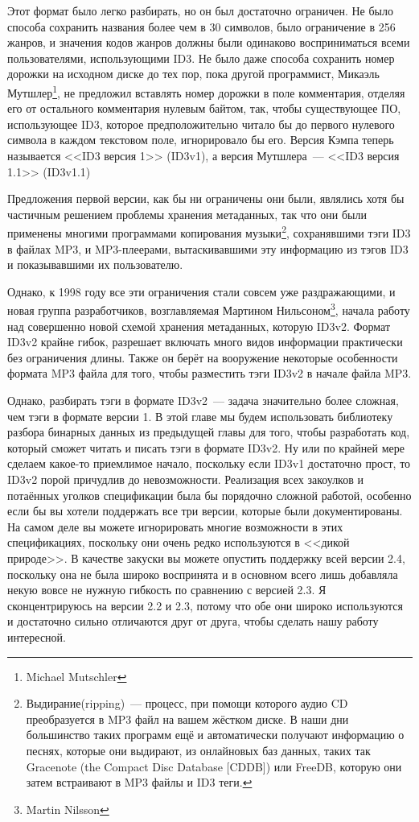 Этот формат было легко разбирать, но он был достаточно ограничен. Не было способа
сохранить названия более чем в 30 символов, было ограничение в 256 жанров, и значения
кодов жанров должны были одинаково восприниматься всеми пользователями, использующими
ID3. Не было даже способа сохранить номер дорожки на исходном диске до тех пор, пока
другой программист, Микаэль Мутшлер\footnote{Michael Mutschler}, не предложил вставлять
номер дорожки в поле комментария, отделяя его от остального комментария нулевым байтом,
так, чтобы существующее ПО, использующее ID3, которое предположительно читало бы до
первого нулевого символа в каждом текстовом поле, игнорировало бы его. Версия Кэмпа теперь
называется <<ID3 версия 1>> (ID3v1), а версия Мутшлера~--- <<ID3 версия 1.1>> (ID3v1.1)

Предложения первой версии, как бы ни ограничены они были, являлись хотя бы частичным
решением проблемы хранения метаданных, так что они были применены многими программами
копирования музыки\footnote{Выдирание(ripping)~--- процесс, при помощи которого аудио CD
  преобразуется в MP3 файл на вашем жёстком диске. В наши дни большинство таких программ
  ещё и автоматически получают информацию о песнях, которые они выдирают, из онлайновых
  баз данных, таких так Gracenote (the Compact Disc Database [CDDB]) или FreeDB, которую
  они затем встраивают в MP3 файлы и ID3 теги.}, сохранявшими тэги ID3 в файлах MP3, и
MP3-плеерами, вытаскивавшими эту информацию из тэгов ID3 и показывавшими их пользователю.

Однако, к 1998 году все эти ограничения стали совсем уже раздражающими, и новая группа
разработчиков, возглавляемая Мартином Нильсоном\footnote{Martin Nilsson}, начала работу
над совершенно новой схемой хранения метаданных, которую ID3v2. Формат ID3v2 крайне гибок,
разрешает включать много видов информации практически без ограничения длины. Также он
берёт на вооружение некоторые особенности формата MP3 файла для того, чтобы разместить
тэги ID3v2 в начале файла MP3.

Однако, разбирать тэги в формате ID3v2~--- задача значительно более сложная, чем тэги в
формате версии 1. В этой главе мы будем использовать библиотеку разбора бинарных данных из
предыдущей главы для того, чтобы разработать код, который сможет читать и писать тэги в
формате ID3v2. Ну или по крайней мере сделаем какое-то приемлимое начало, поскольку если
ID3v1 достаточно прост, то ID3v2 порой причудлив до невозможности. Реализация всех
закоулков и потаённых уголков спецификации была бы порядочно сложной работой, особенно
если бы вы хотели поддержать все три версии, которые были документированы. На самом деле
вы можете игнорировать многие возможности в этих спецификациях, поскольку они очень редко
используются в <<дикой природе>>.  В качестве закуски вы можете опустить поддержку всей
версии 2.4, поскольку она не была широко воспринята и в основном всего лишь добавляла
некую вовсе не нужную гибкость по сравнению с версией 2.3. Я сконцентрируюсь на версии 2.2
и 2.3, потому что обе они широко используются и достаточно сильно отличаются друг от
друга, чтобы сделать нашу работу интересной.

